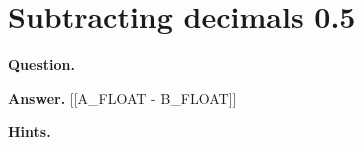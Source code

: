 \documentclass{article}
\begin{document}
\section*{Subtracting decimals 0.5}
\textbf{Question.} 

\textbf{Answer.} [[A\_FLOAT - B\_FLOAT]]

\textbf{Hints.}
\begin{itemize}

\end{itemize}
\end{document}
